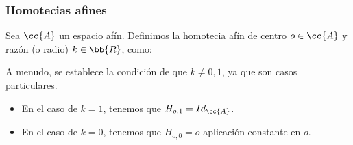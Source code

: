 \subsubsection{Homotecias afines}

\begin{definicion}
    Sea $\cc{A}$ un espacio afín. Definimos la homotecia afín de centro $o\in \cc{A}$ y razón (o radio) $k\in\bb{R}$, como:
\end{definicion}
\begin{observacion}
    A menudo, se establece la condición de que $k\neq 0,1$, ya que son casos particulares. \begin{itemize}
        \item En el caso de $k=1$, tenemos que $H_{o,1}=Id_{\cc{A}}$.
        \item En el caso de $k=0$, tenemos que $H_{o,0}=o$ aplicación constante en $o$.
    \end{itemize}
\end{observacion}

